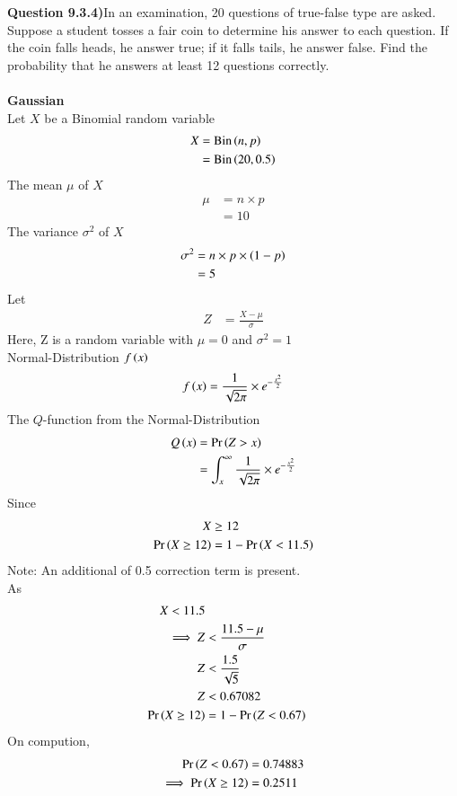 \documentclass[journal,12pt,twocolumn]{IEEEtran}
\theoremstyle{remark}
\begin{document}
\textbf{Question 9.3.4)}In an examination, 20 questions of true-false type are asked. Suppose a student tosses
a fair coin to determine his answer to each question. If the coin falls heads, he answer
true; if it falls tails, he answer false. Find the probability that he answers at least 12
questions correctly.\\
\solution \\
\textbf{Gaussian}\\
Let $X$ be a Binomial random variable
\begin{align}
X &= \textrm{Bin}\left(n,p\right)\\
&= \textrm{Bin}\left(20,0.5\right)
\end{align}
The mean $\mu$ of $X$
\begin{align}
\mu &= n\times p\\
&= 10
\end{align}
The variance $\sigma^{2}$ of $X$
\begin{align}
\sigma^{2} &= n\times p \times \left(1-p\right)\\
&= 5
\end{align}
Let
\begin{align}
Z &= \frac{X-\mu}{\sigma}
\end{align}
Here, Z is a random variable with $\mu=0$ and $\sigma^{2}=1$\\
Normal-Distribution $f\left(x\right)$
\begin{align}
	f\left(x\right) = \frac{1}{\sqrt{2\pi}} \times e^{-\frac{x^2}{2}}\\
\end{align}
The $Q$-function from the Normal-Distribution
\begin{align}
	Q\left(x\right) &= \Pr\left(Z>x\right)\\
	&= \int_{x}^{\infty} \frac{1}{\sqrt{2\pi}} \times e^{-\frac{x^2}{2}}
\end{align}
Since
\begin{align}
X &\ge 12\\
\Pr\left(X \ge 12\right) &= 1-\Pr\left(X<11.5\right)
\end{align}
Note: An additional of 0.5 correction term is present.\\
As
\begin{align}
X<11.5\\ 
\implies Z &< \frac{11.5-\mu}{\sigma}\\
Z &< \frac{1.5}{\sqrt{5}}\\
Z &< 0.67082\\
\Pr\left(X \ge 12\right)&=1-\Pr\left(Z < 0.67\right)
\end{align}
On compution,
\begin{align}
\Pr\left(Z < 0.67\right)&=0.74883\\
\implies \Pr\left(X \ge 12\right)&= 0.2511
\end{align}
\end{document}
